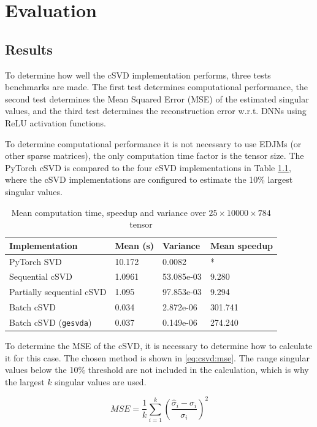 \chapter{Evaluation}

\section{Results}

To determine how well the cSVD implementation performs, three tests benchmarks are made. The first test determines computational performance, the second test determines the Mean Squared Error (MSE) of the estimated singular values, and the third test determines the reconstruction error w.r.t. DNNs using ReLU activation functions.

To determine computational performance it is not necessary to use EDJMs (or other sparse matrices), the only computation time factor is the tensor size. The PyTorch cSVD is compared to the four cSVD implementations in Table \ref{tab:csvd:performance}, where the cSVD implementations are configured to estimate the 10\% largest singular values.

\begin{table}[H]
  \centering
    \begin{tabular}{|l|l|l|l|} \hline
      Implementation & Mean (s) & Variance & Mean speedup \\ \hline
      PyTorch SVD & 10.172 & 0.0082 & * \\ \hline
      Sequential cSVD & 1.0961  & 53.085e-03 & 9.280 \\ \hline
      Partially sequential cSVD & 1.095 & 97.853e-03 & 9.294 \\ \hline
      Batch cSVD & 0.034 & 2.872e-06 & 301.741 \\ \hline
      Batch cSVD (\texttt{gesvda}) & 0.037  & 0.149e-06 & 274.240 \\ \hline
    \end{tabular}
    \caption{Mean computation time, speedup and variance over   $25 \times 10000 \times 784$ tensor}
    \label{tab:csvd:performance}
\end{table}

To determine the MSE of the cSVD, it is necessary to determine how to calculate it for this case. The chosen method is shown in \eqref{eq:csvd:mse}. The range singular values below the 10\% threshold are not included in the calculation, which is why the largest $k$ singular values are used.

\begin{equation}
  \label{eq:csvd:mse}
    MSE = \frac{1}{k} \sum_{i=1}^{k} \left ( \frac{\hat \sigma_i - \sigma_i}{\sigma_i} \right )^2
\end{equation}

